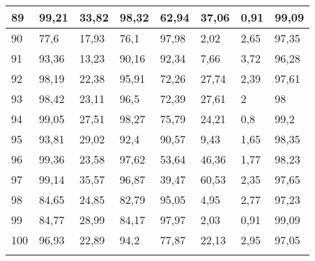 \begin{longtable}[c]{|l|l|l|l|l|l|l|l|}
89              & 99,21        & 33,82        & 98,32       & 62,94         & 37,06         & 0,91          & 99,09         \\ \hline
90              & 77,6         & 17,93        & 76,1        & 97,98         & 2,02          & 2,65          & 97,35         \\ \hline
91              & 93,36        & 13,23        & 90,16       & 92,34         & 7,66          & 3,72          & 96,28         \\ \hline
92              & 98,19        & 22,38        & 95,91       & 72,26         & 27,74         & 2,39          & 97,61         \\ \hline
93              & 98,42        & 23,11        & 96,5        & 72,39         & 27,61         & 2             & 98            \\ \hline
94              & 99,05        & 27,51        & 98,27       & 75,79         & 24,21         & 0,8           & 99,2          \\ \hline
95              & 93,81        & 29,02        & 92,4        & 90,57         & 9,43          & 1,65          & 98,35         \\ \hline
96              & 99,36        & 23,58        & 97,62       & 53,64         & 46,36         & 1,77          & 98,23         \\ \hline
97              & 99,14        & 35,57        & 96,87       & 39,47         & 60,53         & 2,35          & 97,65         \\ \hline
98              & 84,65        & 24,85        & 82,79       & 95,05         & 4,95          & 2,77          & 97,23         \\ \hline
99              & 84,77        & 28,99        & 84,17       & 97,97         & 2,03          & 0,91          & 99,09         \\ \hline
100             & 96,93        & 22,89        & 94,2        & 77,87         & 22,13         & 2,95          & 97,05         \\ \hline
\label{anx:meyer}
\end{longtable}
